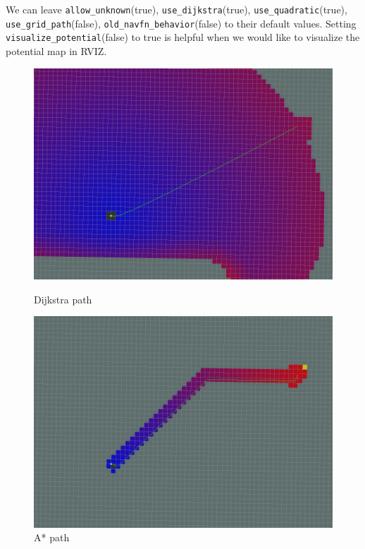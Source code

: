 \documentclass[12pt]{article}
\begin{document}
We can leave \texttt{allow\_unknown}(true), \texttt{use\_dijkstra}(true), \texttt{use\_quadratic}(true), \texttt{use\_grid\_path}(false), \texttt{old\_navfn\_behavior}(false) to
their default values. Setting \texttt{visualize\_potential}(false) to true is helpful when we would like to visualize the potential map in RVIZ.

\begin{figure}[!htb]
  \includegraphics[width=\linewidth]{Dijkstra.png}
  \caption{Dijkstra path}
\endminipage\hfill
{}
  \includegraphics[width=\linewidth]{AStar2.png}
  \caption{A* path}
\endminipage\hfill
\end{figure}
\end{document}
